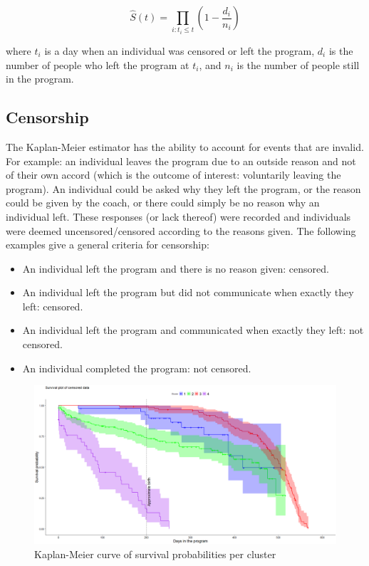 \documentclass[12pt]{article}
\begin{document}
		$$
		\widehat{S}(t) = \prod_{i: t_i \leq t} \left( 1 - \frac{d_i}{n_i} \right)
		$$
		
		where $t_i$ is a day when an individual was censored or left the program, $d_i$ is the number of people who left the program at $t_i$, and $n_i$ is the number of people still in the program.
		
		
		
		\subsection{Censorship}
		
		The Kaplan-Meier estimator has the ability to account for events that are invalid. For example: an individual leaves the program due to an outside reason and not of their own accord (which is the outcome of interest: voluntarily leaving the program). An individual could be asked why they left the program, or the reason could be given by the coach, or there could simply be no reason why an individual left. These responses (or lack thereof) were recorded and individuals were deemed uncensored/censored according to the reasons given. The following examples give a general criteria for censorship:
		\begin{itemize}
			\item An individual left the program and there is no reason given: censored.
			\item An individual left the program but did not communicate when exactly they left: censored.
			\item An individual left the program and communicated when exactly they left: not censored.
			\item An individual completed the program: not censored.
		\end{itemize}
		
		\begin{figure}[h]
			\begin{center}
				\includegraphics[width=150mm]{images/censored, birth.png}
				\caption{Kaplan-Meier curve of survival probabilities per cluster}
				\label{fig:cens_surv}
			\end{center}
		\end{figure}
\end{document}
